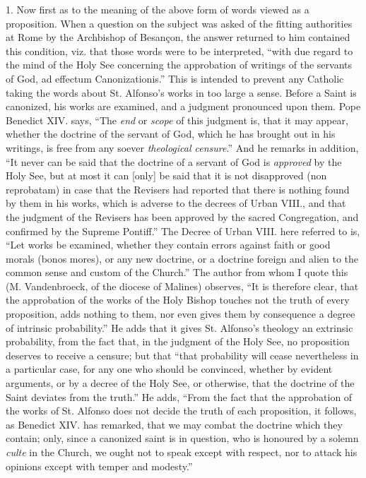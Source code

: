 1. Now first as to the meaning of the above form of words
viewed as a proposition. When a question on the subject was asked of the
fitting authorities at Rome by the Archbishop of Besançon, the answer returned to him contained this condition, viz. that
those words were to be interpreted, ``with due regard to the mind of
the Holy See concerning the approbation of writings of the servants of
God, ad effectum Canonizationis.'' This is intended to prevent any
Catholic taking the words about St. Alfonso's works in too large a
sense. Before a Saint is canonized, his works are examined, and a
judgment pronounced upon them. Pope Benedict XIV. says, ``The \emph{end}
or \emph{scope} of this judgment is, that it may appear, whether
the doctrine of the servant of God, which he has brought out in his
writings, is free from any soever \emph{theological censure}.'' And
he remarks in addition, ``It never can be said that the doctrine of
a servant of God is \emph{approved} by the Holy See, but at most it can
[only] be said that it is not disapproved (non reprobatam) in
case that the Revisers had reported that there is nothing found by them
in his works, which is adverse to the decrees of Urban VIII., and that
the judgment of the Revisers has been approved by the sacred
Congregation, and confirmed by the Supreme Pontiff.'' The Decree of
Urban VIII. here referred to is, ``Let works be examined, whether
they contain errors against faith or good morals (bonos mores), or any
new doctrine, or a doctrine foreign and alien to the common sense and
custom of the Church.'' The author from whom I quote this (M.
Vandenbroeck, of the diocese of Malines) observes, ``It is therefore
clear, that the approbation of the works of the Holy Bishop touches not
the truth of every proposition, adds nothing to them, nor even gives
them by consequence a degree of intrinsic probability.'' He adds
that it gives St. Alfonso's theology an extrinsic probability, from the
fact that, in the judgment of the Holy See, no proposition deserves to
receive a censure; but that ``that probability will cease
nevertheless in a particular case, for any one who should be convinced,
whether by evident arguments, or by a decree of the Holy See, or
otherwise, that the doctrine of the Saint deviates from the truth.''
He adds, ``From the fact that the approbation of the works of St.
Alfonso does not decide the truth of each proposition, it follows, as
Benedict XIV. has remarked, that we may combat the doctrine which they
contain; only, since a canonized saint is in question, who is honoured
by a solemn \emph{culte} in the Church, we ought not to speak except
with respect, nor to attack his opinions except with temper and
modesty.''


